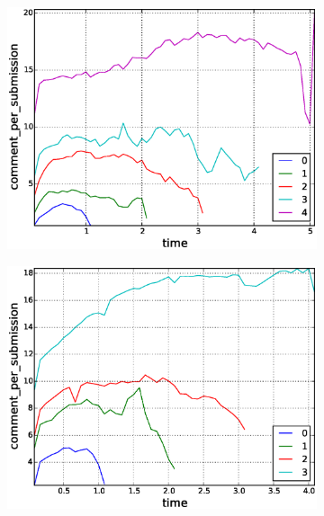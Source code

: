 \begin{figure}[!tb]
\begin{subfigure}{.3\textwidth}\includegraphics[scale=0.285]{./images/comments_per_submissions_for_surviving_year_for_2010.eps}\caption{}\end{subfigure}
\begin{subfigure}{.3\textwidth}\includegraphics[scale=0.285]{./images/comments_per_submissions_for_surviving_year_for_2011.eps}\caption{}\end{subfigure}

\end{figure}
